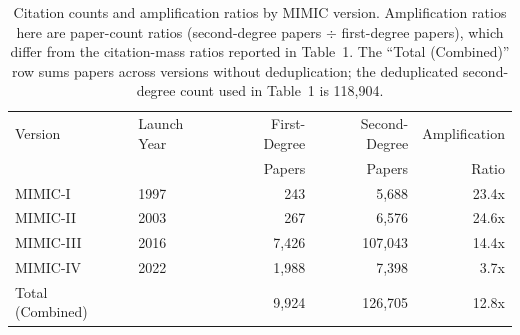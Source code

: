 \begin{table}[htbp]
\centering
\caption{Citation counts and amplification ratios by MIMIC version. Amplification ratios here are paper-count ratios (second-degree papers $\div$ first-degree papers), which differ from the citation-mass ratios reported in Table~1. The ``Total (Combined)'' row sums papers across versions without deduplication; the deduplicated second-degree count used in Table~1 is 118,904.}
\label{tab:mimic_versions}
\begin{tabular}{llrrr}
\toprule
Version & Launch Year & First-Degree & Second-Degree & Amplification \\
 & & Papers & Papers & Ratio \\
\midrule
MIMIC-I & 1997 & 243 & 5,688 & 23.4x \\
MIMIC-II & 2003 & 267 & 6,576 & 24.6x \\
MIMIC-III & 2016 & 7,426 & 107,043 & 14.4x \\
MIMIC-IV & 2022 & 1,988 & 7,398 & 3.7x \\
\midrule
Total (Combined) &  & 9,924 & 126,705 & 12.8x \\
\bottomrule
\end{tabular}
\end{table}
